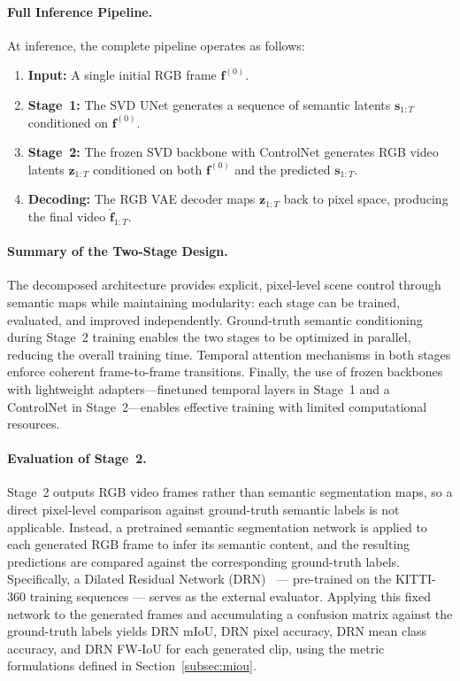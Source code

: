 \paragraph{Full Inference Pipeline.}
At inference, the complete pipeline operates as follows:
\begin{enumerate}
    \item \textbf{Input:} A single initial RGB frame $\mathbf{f}^{(0)}$.
    \item \textbf{Stage~1:} The SVD UNet generates a sequence of semantic latents $\mathbf{s}_{1:T}$ conditioned on $\mathbf{f}^{(0)}$.
    \item \textbf{Stage~2:} The frozen SVD backbone with ControlNet generates RGB video latents $\mathbf{z}_{1:T}$ conditioned on both $\mathbf{f}^{(0)}$ and the predicted $\mathbf{s}_{1:T}$.
    \item \textbf{Decoding:} The RGB VAE decoder maps $\mathbf{z}_{1:T}$ back to pixel space, producing the final video $\hat{\mathbf{f}}_{1:T}$.
\end{enumerate}

\paragraph{Summary of the Two-Stage Design.}
The decomposed architecture provides explicit, pixel-level scene control through semantic maps while maintaining modularity: each stage can be trained, evaluated, and improved independently. Ground-truth semantic conditioning during Stage~2 training enables the two stages to be optimized in parallel, reducing the overall training time. Temporal attention mechanisms in both stages enforce coherent frame-to-frame transitions. Finally, the use of frozen backbones with lightweight adapters---finetuned temporal layers in Stage~1 and a ControlNet in Stage~2---enables effective training with limited computational resources.

\paragraph{Evaluation of Stage~2.}
Stage~2 outputs RGB video frames rather than semantic segmentation maps, so a direct pixel-level comparison against ground-truth semantic labels is not applicable. Instead, a pretrained semantic segmentation network is applied to each generated RGB frame to infer its semantic content, and the resulting predictions are compared against the corresponding ground-truth labels. Specifically, a Dilated Residual Network (DRN)~\cite{yu2017dilated} — pre-trained on the KITTI-360 training sequences — serves as the external evaluator. Applying this fixed network to the generated frames and accumulating a confusion matrix against the ground-truth labels yields DRN mIoU, DRN pixel accuracy, DRN mean class accuracy, and DRN FW-IoU for each generated clip, using the metric formulations defined in Section~\ref{subsec:miou}.

